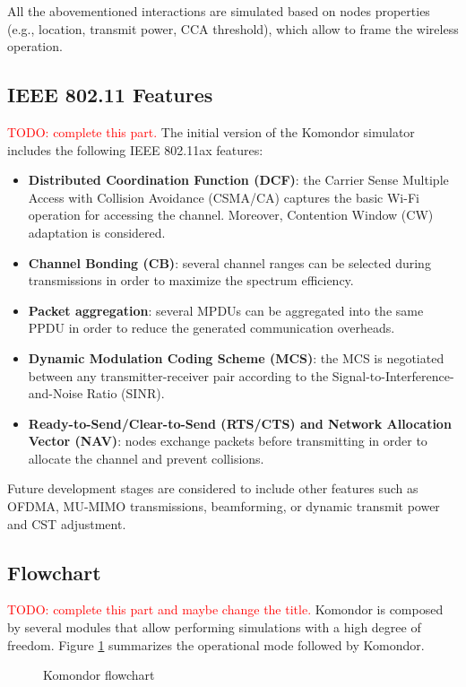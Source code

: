 \documentclass[a4paper]{article}
\begin{document}
All the abovementioned interactions are simulated based on nodes properties (e.g., location, transmit power, CCA threshold), which allow to frame the wireless operation.

\subsection{IEEE 802.11 Features}
\textcolor{red}{TODO: complete this part.}
The initial version of the Komondor simulator includes the following IEEE 802.11ax features:
\begin{itemize}
	\item \textbf{Distributed Coordination Function (DCF)}: the Carrier Sense Multiple Access with Collision Avoidance (CSMA/CA) captures the basic Wi-Fi operation for accessing the channel. Moreover, Contention Window (CW) adaptation is considered.
	\item \textbf{Channel Bonding (CB)}: several channel ranges can be selected during transmissions in order to maximize the spectrum efficiency.
	\item \textbf{Packet aggregation}: several MPDUs can be aggregated into the same PPDU in order to reduce the generated communication overheads.
	\item\textbf{ Dynamic Modulation Coding Scheme (MCS)}: the MCS is negotiated between any transmitter-receiver pair according to the Signal-to-Interference-and-Noise Ratio (SINR).
	\item \textbf{Ready-to-Send/Clear-to-Send (RTS/CTS) and Network Allocation Vector (NAV)}: nodes exchange packets before transmitting in order to allocate the channel and prevent collisions.
\end{itemize}

Future development stages are considered to include other features such as OFDMA, MU-MIMO transmissions, beamforming, or dynamic transmit power and CST adjustment.

\subsection{Flowchart}
\textcolor{red}{TODO: complete this part and maybe change the title.}
Komondor is composed by several modules that allow performing simulations with a high degree of freedom. Figure \ref{fig:komondor_flowchart} summarizes the operational mode followed by Komondor.
\begin{figure}[h!]
	\centering
	\caption{Komondor flowchart}
	\label{fig:komondor_flowchart}
\end{figure}		
\end{document}
